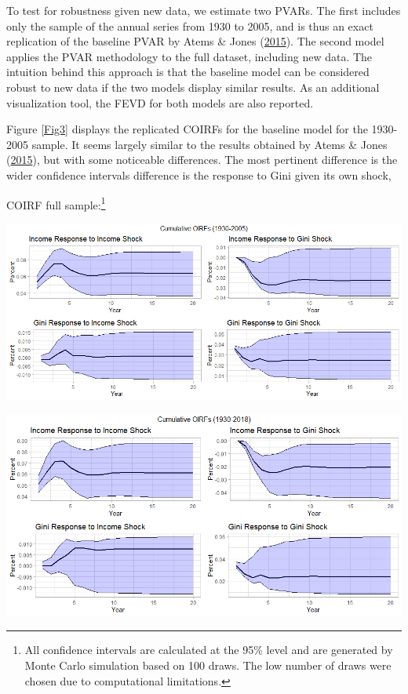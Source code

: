 \documentclass[11pt,preprint, authoryear]{elsarticle}
\let\origfigure\figure
\let\endorigfigure\endfigure
\renewenvironment{figure}[1][2] {
    \expandafter\origfigure\expandafter[H]
} {
    \endorigfigure
}
\numberwithin{equation}{section}
\numberwithin{figure}{section}
\numberwithin{table}{section}
\let\rmarkdownfootnote\footnote%
\def\footnote{\protect\rmarkdownfootnote}
\begin{document}
To test for robustness given new data, we estimate two PVARs. The first
includes only the sample of the annual series from 1930 to 2005, and is
thus an exact replication of the baseline PVAR by Atems \& Jones
(\protect\hyperlink{ref-atems}{2015}). The second model applies the PVAR
methodology to the full dataset, including new data. The intuition
behind this approach is that the baseline model can be considered robust
to new data if the two models display similar results. As an additional
visualization tool, the FEVD for both models are also reported.

Figure \ref{Fig3} displays the replicated COIRFs for the baseline model
for the 1930-2005 sample. It seems largely similar to the results
obtained by Atems \& Jones (\protect\hyperlink{ref-atems}{2015}), but
with some noticeable differences. The most pertinent difference is the
wider confidence intervals difference is the response to Gini given its
own shock,

COIRF full sample:\footnote{All confidence intervals are calculated at
  the 95\% level and are generated by Monte Carlo simulation based on
  100 draws. The low number of draws were chosen due to computational
  limitations.}

\newpage

\begin{figure}[H]

{\centering \includegraphics[width=1\linewidth]{images/Fig3_rep_COIRFs} 

}

\caption{\label{Fig3}}\label{fig:Fig3}
\end{figure}

\begin{figure}[H]

{\centering \includegraphics[width=1\linewidth]{images/Fig4_baseline_full_COIRFs} 

}

\caption{\label{Fig4}}\label{fig:Fig4}
\end{figure}
\end{document}
